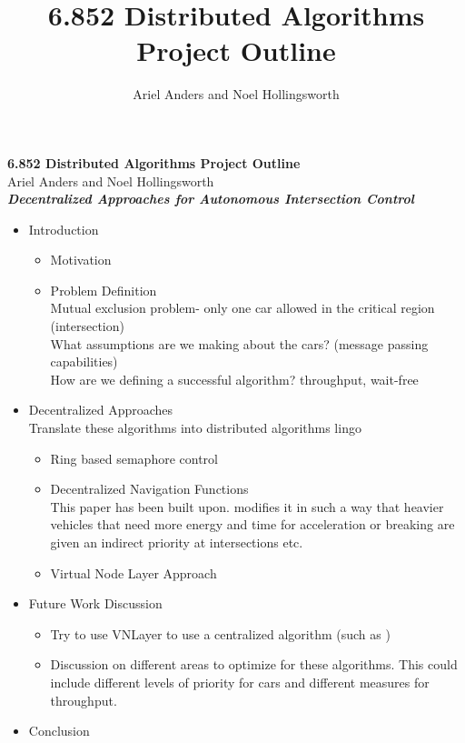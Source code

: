 \documentclass[12pt]{article}
\title{6.852 Distributed Algorithms Project Outline}
\author{Ariel Anders and Noel Hollingsworth}
\begin{document}
\begin{center}{\bf \Large
6.852 Distributed Algorithms Project Outline\\ }
Ariel Anders and Noel Hollingsworth 
\\
{\bf \em Decentralized Approaches for Autonomous Intersection Control }
\end{center}
\begin{itemize}
\item Introduction
	\begin{itemize}
		\item Motivation  
		\item Problem Definition\\
		Mutual exclusion problem- only one car allowed in the critical region (intersection)\\
		What assumptions are we making about the cars? (message passing capabilities)\\
		How are we defining a successful algorithm?  throughput, wait-free\\
	\end{itemize}
\item Decentralized Approaches  \\ 
Translate these algorithms into distributed algorithms lingo
\begin{itemize}
	\item Ring based semaphore control \cite{naumann}
	\item Decentralized Navigation Functions \cite{roozbehani}\\
	This paper has been built upon.  \cite{makarem} modifies it in such a way that heavier vehicles that need more energy and time for acceleration or breaking are given an indirect priority at intersections etc.
	\item Virtual Node Layer Approach \cite{vnlayer}
\end{itemize}
\item Future Work Discussion
	\begin{itemize}
		\item Try to use VNLayer to use a centralized algorithm (such as  \cite{dresner})
		\item Discussion on different areas to optimize for these algorithms.  This could include different levels of priority for cars and different measures for throughput.
	\end{itemize}
\item Conclusion
\end{itemize}
\end{document}
